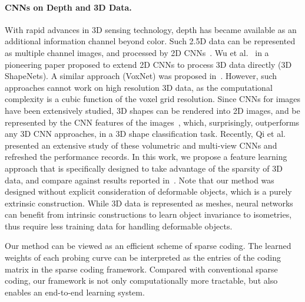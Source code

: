 \paragraph{CNNs on Depth and 3D Data.} With rapid advances in 3D sensing technology, depth has became available as an additional information channel beyond color. Such 2.5D data can be represented as multiple channel images, and processed by 2D CNNs~\cite{Socher_NIPS12_Convolutional,Gupta_ECCV14_Learning,Eitel_IROS15_Multimodal}. Wu et al.~\cite{WU_CVPR15_3D} in a pioneering paper proposed to extend 2D CNNs to process 3D data directly (3D ShapeNets).
A similar approach (VoxNet) was proposed in~\cite{Maturana_IROS15_VoxNet}. However, such approaches cannot work on high resolution 3D data, as the computational complexity is a cubic function of the voxel grid resolution. Since CNNs for images have been extensively studied, 3D shapes can be rendered into 2D images, and be represented by the CNN features of the images~\cite{Shi_SPL15_DeepPano,Su_ICCV15_Multi}, which, surprisingly, outperforms any 3D CNN approaches, in a 3D shape classification task. Recently, Qi et al.~\cite{qi2016volumetric} presented an extensive study of these volumetric and multi-view CNNs and refreshed the performance records. In this work, we propose a feature learning approach that is specifically designed to take advantage of the sparsity of 3D data, and compare against results reported in~\cite{qi2016volumetric}. Note that our method was designed without explicit consideration of deformable objects, which is a purely extrinsic construction. While 3D data is represented as meshes, neural networks can benefit from intrinsic constructions\cite{litman2014learning,masci2015geodesic,Boscaini_SGP15_Learning,boscaini2016anisotropic} to learn object invariance to isometries, thus require less training data for handling deformable objects.

Our method can be viewed as an efficient scheme of sparse coding\cite{donoho2006compressed}. The learned weights of each probing curve can be interpreted as the entries of the coding matrix in the sparse coding framework. Compared with conventional sparse coding, our framework is not only computationally more tractable, but also enables an end-to-end learning system.